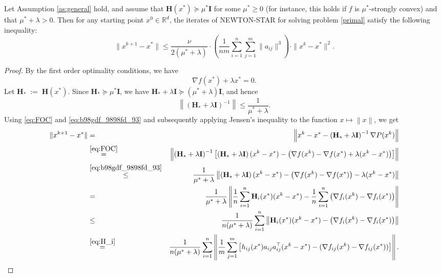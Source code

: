 \documentclass[12pt]{article}
\newcommand{\squeeze}{}
\newcommand{\eqdef}{\; { := }\;}
\newcommand{\R}{\mathbb{R}}
\newcommand{\norm}[1]{\left\|#1\right\|}
\newcommand{\newalpha}{h}
\newcommand{\mH}{\mathbf{H}}
\newcommand{\mI}{\mathbf{I}}
\begin{document}
\begin{theorem}\label{th:localquadratic}
Let  Assumption \ref{as:general} hold,  and assume that $\mH(x^*) \succeq \mu^* \mI$ for some $\mu^* \geq 0$ (for instance, this holds if $f$ is $\mu^*$-strongly convex) and that $\mu^*+\lambda >0$. Then for any starting point $x^0 \in \R^d$, the iterates of {\sf NEWTON-STAR} for solving problem \eqref{primal}   satisfy the following inequality:
\begin{equation}
\label{eq:NS-rate}
 \squeeze
 \|x^{k+1} - x^*\| \leq \frac{\nu }{2(\mu^*+\lambda)} \cdot \left( \frac{1}{nm} \sum \limits_{i=1}^n \sum \limits_{j=1}^{m} \|a_{ij}\|^3 \right) \cdot \|x^k-x^*\|^2. 
\end{equation}
\end{theorem}
\begin{proof}
{\footnotesize
By the first order optimality conditions, we have 
\begin{equation}\nabla f(x^*) + \lambda x^* = 0.\label{eq:FOC}\end{equation}
Let $\mH_* \eqdef \mH(x^*)$. Since $\mH_* \succeq \mu^* \mI$, we have $\mH_* +\lambda \mI \succeq (\mu^* +\lambda) \mI$, and hence \begin{equation}\label{eq:b98gdf_9898fd_93} \norm{\left(\mH_* + \lambda \mI\right)^{-1} } \leq \frac{1}{\mu^*+\lambda}.\end{equation} 
Using \eqref{eq:FOC} and \eqref{eq:b98gdf_9898fd_93}  and subsequently applying Jensen's inequality  to the function $x\mapsto \norm{x}$, we get 
\begin{eqnarray}
	\|x^{k+1} - x^*\| &=&\left \| x^k - x^*  - \left(\mH_* +\lambda \mI \right)^{-1} \nabla P(x^k)  \right \|  \notag \\
	&\overset{\eqref{eq:FOC}}{=}& \left \| \left(\mH_* +\lambda \mI \right)^{-1} \left[ \left(\mH_* + \lambda \mI \right)(x^k - x^*) - \left(\nabla f(x^k) -\nabla f(x^*)+ \lambda (x^k-x^*)\right)   \right] \right \|  \notag \\ 
	&\overset{\eqref{eq:b98gdf_9898fd_93}}{\leq} &\frac{1}{\mu^*+\lambda} \left \|  \left(\mH_* + \lambda \mI \right) (x^k - x^*) - \left( \nabla f(x^k) - \nabla f(x^*)   \right) - \lambda (x^k -x^*) \right \|  \notag \\ 
	&= &\frac{1}{\mu^*+\lambda} \left \|  \frac{1}{n} \sum_{i=1}^{n}  \mH_i(x^*) (x^k - x^*) -  \frac{1}{n}\sum_{i=1}^n \left( \nabla f_i(x^k) - \nabla f_i(x^*)   \right) \right \|  \notag \\ 
	&\leq & \frac{1}{n (\mu^*+\lambda)} \sum_{i=1}^{n}  \left \|  \mH_i(x^*) (x^k - x^*) -  \left( \nabla f_i(x^k) - \nabla f_i(x^*)   \right) \right \|  \notag \\ 	
	&\overset{\eqref{eq:H_i} }{=} &\frac{1}{n (\mu^*+\lambda)} \sum_{i=1}^{n}  \left \| \frac{1}{m} \sum_{j=1}^m \left[\newalpha_{ij}(x^*) a_{ij} a_{ij}^\top (x^k - x^*)- (\nabla f_{ij}(x^k) - \nabla f_{ij}(x^*))\right] \right \|  . \label{eq:rand-opur-9}
	\end{eqnarray}
	
}
\end{proof}
\end{document}
